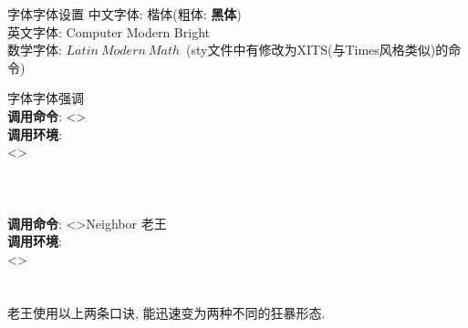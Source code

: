 \documentclass[hyperref, UTF8, CJK, aspectratio=169]{beamer}
\begin{document}
\begin{frame}{字体}{字体设置}
  中文字体: 楷体(粗体: \textbf{黑体})\\
  英文字体: Computer Modern Bright\\
  数学字体: $Latin\ Modern\ Math$~(sty文件中有修改为XITS(与Times风格类似)的命令)\\
\end{frame}

\begin{frame}{字体}{字体强调}
  \\
  
  \textbf{调用命令}: \textcolor{univgrey}{<>}\hfill{}\\
  \textbf{调用环境}:\\
  \textcolor{univgrey}{<>}\\
  \hspace*{1em}\\
  \\[2ex]
  
  \\
  
  \textbf{调用命令}: \textcolor{univgrey}{<>}\hfill\alert{Neighbor 老王}\\
  \textbf{调用环境}:\\
  \textcolor{univgrey}{<>}\\
  \hspace*{1em}\\
  \\
  
  老王使用以上两条口诀, 能迅速变为两种不同的狂暴形态.
\end{frame}
\end{document}

